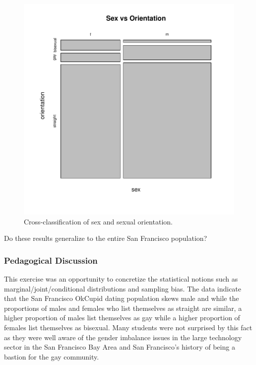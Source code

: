 \documentclass{article}\usepackage[]{graphicx}\usepackage[]{color}
\makeatletter
\def\maxwidth{ %
  \ifdim\Gin@nat@width>\linewidth
    \linewidth
  \else
    \Gin@nat@width
  \fi
}
\newenvironment{knitrout}{}{} %
\makeatother
\begin{document}
\begin{knitrout}
\begin{figure}
{\centering \includegraphics[width=\maxwidth]{figure/sex_by_orientation-1} 

}

\caption[Cross-classification of sex and sexual orientation]{Cross-classification of sex and sexual orientation.}\label{fig:sex_by_orientation}
\end{figure}


\end{knitrout}

Do these results generalize to the entire San Francisco population?



\subsubsection{Pedagogical Discussion}
This exercise was an opportunity to concretize the statistical notions such as marginal/joint/conditional distributions and sampling bias.  The data indicate that the San Francisco OkCupid dating population skews male and while the proportions of males and females who list themselves as straight are similar, a higher proportion of males list themselves as gay while a higher proportion of females list themselves as bisexual.  Many students were not surprised by this fact as they were well aware of the gender imbalance issues in the large technology sector in the San Francisco Bay Area and San Francisco's history of being a bastion for the gay community.
\end{document}
